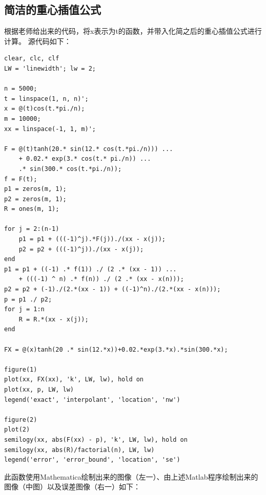 \documentclass[]{report}
\begin{document}
		\subsection{简洁的重心插值公式}
		根据老师给出来的代码，将x表示为t的函数，并带入化简之后的重心插值公式进行计算。
		源代码如下：
		\begin{lstlisting}
clear, clc, clf
LW = 'linewidth'; lw = 2;

n = 5000;
t = linspace(1, n, n)';
x = @(t)cos(t.*pi./n);
m = 10000;
xx = linspace(-1, 1, m)';

F = @(t)tanh(20.* sin(12.* cos(t.*pi./n))) ...
	+ 0.02.* exp(3.* cos(t.* pi./n)) ...
	.* sin(300.* cos(t.*pi./n));
f = F(t);
p1 = zeros(m, 1);
p2 = zeros(m, 1);
R = ones(m, 1);

for j = 2:(n-1)
	p1 = p1 + (((-1)^j).*F(j))./(xx - x(j));
	p2 = p2 + (((-1)^j))./(xx - x(j));
end
p1 = p1 + ((-1) .* f(1)) ./ (2 .* (xx - 1)) ...
	+ (((-1) ^ n) .* f(n)) ./ (2 .* (xx - x(n)));
p2 = p2 + (-1)./(2.*(xx - 1)) + ((-1)^n)./(2.*(xx - x(n)));
p = p1 ./ p2;
for j = 1:n
	R = R.*(xx - x(j));
end

FX = @(x)tanh(20 .* sin(12.*x))+0.02.*exp(3.*x).*sin(300.*x);

figure(1)
plot(xx, FX(xx), 'k', LW, lw), hold on
plot(xx, p, LW, lw)
legend('exact', 'interpolant', 'location', 'nw')

figure(2)
plot(2)
semilogy(xx, abs(F(xx) - p), 'k', LW, lw), hold on
semilogy(xx, abs(R)/factorial(n), LW, lw)
legend('error', 'error_bound', 'location', 'se')
		\end{lstlisting}
		此函数使用Mathematica绘制出来的图像（左一）、由上述Matlab程序绘制出来的图像（中图）以及误差图像（右一）如下：
\end{document}
